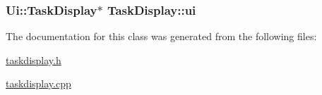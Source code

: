 \subsubsection[{\texorpdfstring{ui}{ui}}]{\setlength{\rightskip}{0pt plus 5cm}Ui\+::\+Task\+Display$\ast$ Task\+Display\+::ui\hspace{0.3cm}{\ttfamily [private]}}\hypertarget{classTaskDisplay_a580ecd014e47a399bf6416fa31aff7da}{}\label{classTaskDisplay_a580ecd014e47a399bf6416fa31aff7da}


The documentation for this class was generated from the following files\+:\begin{DoxyCompactItemize}
\item 
\hyperlink{taskdisplay_8h}{taskdisplay.\+h}\item 
\hyperlink{taskdisplay_8cpp}{taskdisplay.\+cpp}\end{DoxyCompactItemize}
